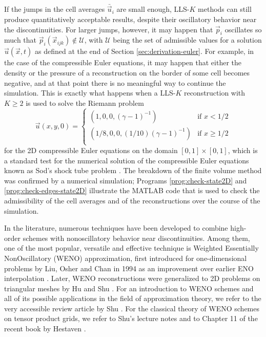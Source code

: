 If the jumps in the cell averages $\bar{\vec{u}}_i$ are small enough,
LLS-$K$ methods can still produce quantitatively acceptable results,
despite their oscillatory behavior near the discontinuities.
For larger jumps, however, it may happen that $\vec{p}_i$ oscillates
so much that $\vec{p}_i(\vec{x}_{ijk}) \notin \mathcal{U}$, with $\mathcal{U}$
being the set of admissible values for a solution $\vec{u}(\vec{x},t)$
as defined at the end of Section \ref{sec:derivation-euler}.
For example, in the case of the compressible Euler equations, it may happen
that either the density or the pressure of a reconstruction on the border
of some cell becomes negative, and at that point there is no meaningful
way to continue the simulation.
This is exactly what happens when a LLS-$K$ reconstruction with $K \geq 2$
is used to solve the Riemann problem
\begin{equation} \label{eq:sod-shock-tube}
\vec{u}(x,y,0) = 
\begin{cases}
(1,0,0,(\gamma-1)^{-1}) &\text{if $x < 1/2$} \\
(1/8,0,0,(1/10)(\gamma-1)^{-1}) &\text{if $x \geq 1/2$} \\
\end{cases}
\end{equation}
for the 2D compressible Euler equations on the domain $[0,1] \times [0,1]$,
which is a standard test for the numerical solution of the compressible
Euler equations known as Sod's shock tube problem \cite{sod1978survey}.
The breakdown of the finite volume method was confirmed by a numerical
simulation; Programs \ref{prog:check-state2D} and \ref{prog:check-edges-state2D}
illustrate the MATLAB code that is used to check the admissibility
of the cell averages and of the reconstructions over the course of the simulation.

In the literature, numerous techniques have been developed to combine
high-order schemes with nonoscillatory behavior near discontinuities.
Among them, one of the most popular, versatile and effective technique
is Weighted Essentially NonOscillatory (WENO) approximation,
first introduced for one-dimensional problems by Liu, Osher and Chan in 1994 as an
improvement over earlier ENO interpolation \cite{liu1994weighted}.
Later, WENO reconstructions were generalized to 2D problems on triangular
meshes by Hu and Shu \cite{hu1999weighted}.
For an introduction to WENO schemes and all of its possible
applications in the field of approximation theory, we refer
to the very accessible review article by Shu \cite{shu2009high}.
For the classical theory of WENO schemes on tensor product grids,
we refer to Shu's lecture notes \cite{cockburn2006advanced}
and to Chapter 11 of the recent book by Hestaven \cite{hesthaven2017numerical}.

